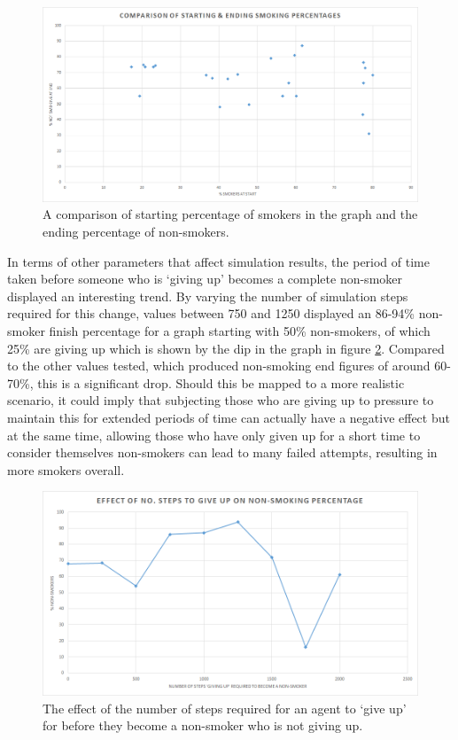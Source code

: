 \documentclass[]{report}
\begin{document}
\begin{figure}
\label{img:smok-pct}
\begin{center}
\includegraphics[scale=0.5]{smok-pct.png}
\end{center}
\caption{A comparison of starting percentage of smokers in the graph and the ending percentage of non-smokers.}
\end{figure}

In terms of other parameters that affect simulation results, the period of time taken before someone who is `giving up' becomes a complete non-smoker displayed an interesting trend. By varying the number of simulation steps required for this change, values between 750 and 1250 displayed an 86-94\% non-smoker finish percentage for a graph starting with 50\% non-smokers, of which 25\% are giving up which is shown by the dip in the graph in figure \ref{img:give-up}. Compared to the other values tested, which produced non-smoking end figures of around 60-70\%, this is a significant drop. Should this be mapped to a more realistic scenario, it could imply that subjecting those who are giving up to pressure to maintain this for extended periods of time can actually have a negative effect but at the same time, allowing those who have only given up for a short time to consider themselves non-smokers can lead to many failed attempts, resulting in more smokers overall.

\begin{figure}
\label{img:give-up}
\begin{center}
\includegraphics[scale=0.5]{give-up.png}
\end{center}
\caption{The effect of the number of steps required for an agent to `give up' for before they become a non-smoker who is not giving up.}
\end{figure}
\end{document}
